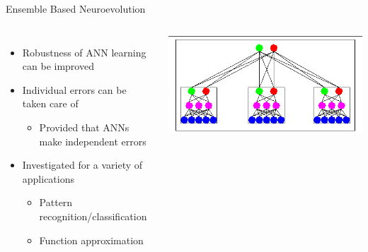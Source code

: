 \documentclass{beamer}
\begin{document}
	\begin{frame}{Ensemble Based Neuroevolution}
	\begin{columns}[l c]


		\begin{itemize}

		\item Robustness of ANN learning can be improved

		\item Individual errors can be taken care of %
			\begin{itemize}
			\item Provided that ANNs make independent errors
			\end{itemize}

		\item Investigated for a variety of applications
			\begin{itemize}
			\item Pattern recognition/classification
			\item Function approximation
			\end{itemize}

		\end{itemize}



		
			\includegraphics[width=\textwidth]{ensemble.png}

		
	\end{columns}
	\end{frame}
\end{document}
